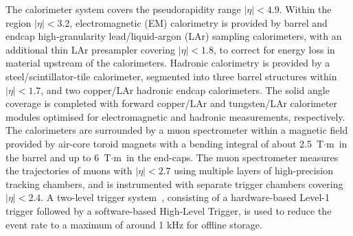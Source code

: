 The calorimeter system covers the pseudorapidity range $|\eta| < 4.9$.
Within the region $|\eta|< 3.2$, electromagnetic (EM) calorimetry is provided by barrel and 
endcap high-granularity lead/liquid-argon (LAr) sampling calorimeters,
with an additional thin LAr presampler covering $|\eta| < 1.8$,
to correct for energy loss in material upstream of the calorimeters.
Hadronic calorimetry is provided by %
a steel/scintillator-tile calorimeter,
segmented into three barrel structures within $|\eta| < 1.7$, and two copper/LAr hadronic endcap calorimeters.
The solid angle coverage is completed with forward copper/LAr and tungsten/LAr calorimeter modules
optimised for electromagnetic and hadronic measurements, respectively.
The calorimeters are surrounded by a muon spectrometer within a magnetic field provided by air-core toroid magnets 
with a bending integral of about 2.5 $\text{T}\cdot\text{m}$ in the barrel and up to 6 $\text{T}\cdot\text{m}$ in the end-caps. 
The muon spectrometer measures the trajectories of muons with $|\eta|<2.7$ using multiple layers of high-precision tracking chambers,
and is instrumented with separate trigger chambers covering $|\eta|<2.4$.
A two-level trigger system~\cite{Aaboud:2016leb}, consisting of a hardware-based Level-1 trigger followed by 
a software-based High-Level Trigger, is used to reduce the event rate to a maximum of around 1 kHz for offline storage.
